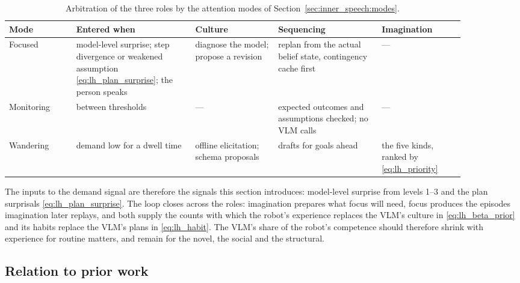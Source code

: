 \begin{table}[ht]
    \centering
    \small
    \begin{tabular}{|>{\raggedright\arraybackslash}p{0.13\linewidth}|>{\raggedright\arraybackslash}p{0.23\linewidth}|>{\raggedright\arraybackslash}p{0.16\linewidth}|>{\raggedright\arraybackslash}p{0.2\linewidth}|>{\raggedright\arraybackslash}p{0.16\linewidth}|}
        \hline
        \textbf{Mode} & \textbf{Entered when} & \textbf{Culture} & \textbf{Sequencing} & \textbf{Imagination} \\ \hline
        Focused    & model-level surprise; step divergence or weakened assumption \eqref{eq:lh_plan_surprise}; the person speaks & diagnose the model; propose a revision & replan from the actual belief state, contingency cache first & --- \\ \hline
        Monitoring & between thresholds & --- & expected outcomes and assumptions checked; no VLM calls & --- \\ \hline
        Wandering  & demand low for a dwell time & offline elicitation; schema proposals & drafts for goals ahead & the five kinds, ranked by \eqref{eq:lh_priority} \\ \hline
    \end{tabular}
    \caption{Arbitration of the three roles by the attention modes of Section~\ref{sec:inner_speech:modes}.}
    \label{tab:lh_modes}
\end{table}

The inputs to the demand signal are therefore the signals this section introduces: model-level surprise from levels
1--3 and the plan surprisals \eqref{eq:lh_plan_surprise}. The loop closes across the roles: imagination prepares what
focus will need, focus produces the episodes imagination later replays, and both supply the counts with which the
robot's experience replaces the VLM's culture in \eqref{eq:lh_beta_prior} and its habits replace the VLM's plans in
\eqref{eq:lh_habit}. The VLM's share of the robot's competence should therefore shrink with experience for routine
matters, and remain for the novel, the social and the structural.

\subsection{Relation to prior work}
\label{sec:lang_hierarchy:related}

